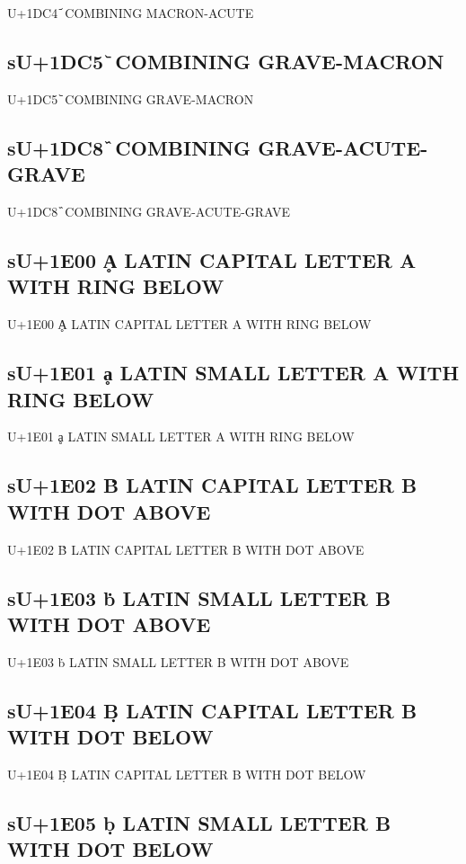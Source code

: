 U+1DC4 ᷄ COMBINING MACRON-ACUTE

\subsection{sU+1DC5 ᷅ COMBINING GRAVE-MACRON}

U+1DC5 ᷅ COMBINING GRAVE-MACRON

\subsection{sU+1DC8 ᷈ COMBINING GRAVE-ACUTE-GRAVE}

U+1DC8 ᷈ COMBINING GRAVE-ACUTE-GRAVE

\subsection{sU+1E00 Ḁ LATIN CAPITAL LETTER A WITH RING BELOW}

U+1E00 Ḁ LATIN CAPITAL LETTER A WITH RING BELOW

\subsection{sU+1E01 ḁ LATIN SMALL LETTER A WITH RING BELOW}

U+1E01 ḁ LATIN SMALL LETTER A WITH RING BELOW

\subsection{sU+1E02 Ḃ  LATIN CAPITAL LETTER B WITH DOT ABOVE}

U+1E02 Ḃ  LATIN CAPITAL LETTER B WITH DOT ABOVE

\subsection{sU+1E03 ḃ  LATIN SMALL LETTER B WITH DOT ABOVE}

U+1E03 ḃ  LATIN SMALL LETTER B WITH DOT ABOVE

\subsection{sU+1E04 Ḅ LATIN CAPITAL LETTER B WITH DOT BELOW}

U+1E04 Ḅ LATIN CAPITAL LETTER B WITH DOT BELOW

\subsection{sU+1E05 ḅ LATIN SMALL LETTER B WITH DOT BELOW}

